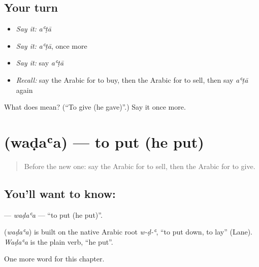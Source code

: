 \subsection*{Your turn}
\begin{itemize}
\raggedright
  \item \emph{Say it:} \emph{aʿṭā}
  \item \emph{Say it:} \emph{aʿṭā}, once more
  \item \emph{Say it:} say \emph{aʿṭā}
  \item \emph{Recall:} say the Arabic for to buy, then the Arabic for to sell, then say \emph{aʿṭā} again
\end{itemize}

\begin{tcolorbox}[breakable,colback=teal!4,colframe=teal!35!black,title={Before you move on}]
What does  mean? (\textquotedblleft{}To give (he gave)\textquotedblright{}.) Say it once more.
\end{tcolorbox}
\section[\texorpdfstring{\ar{وضع} (waḍaʿa)}{وضع (waḍaʿa)}]{ (waḍaʿa) — to put (he put)}

\label{lesson:AR-C59-wadaa}



\begin{quote}
Before the new one: say the Arabic for to sell, then the Arabic for to give.
\end{quote}

\subsection*{You'll want to know: }
\textbf{} — \emph{waḍaʿa} — \textquotedblleft{}to put (he put)\textquotedblright{}.

\begin{cousinweb}
\textbf{} (\emph{waḍaʿa}) is built on the native Arabic root \emph{w-ḍ-ʿ}, \textquotedblleft{}to put down, to lay\textquotedblright{} (Lane). \emph{Waḍaʿa} is the plain verb, \textquotedblleft{}he put\textquotedblright{}.
\end{cousinweb}

\begin{grammarlens}[title={What you've built}]
One more word for this chapter.
\end{grammarlens}

